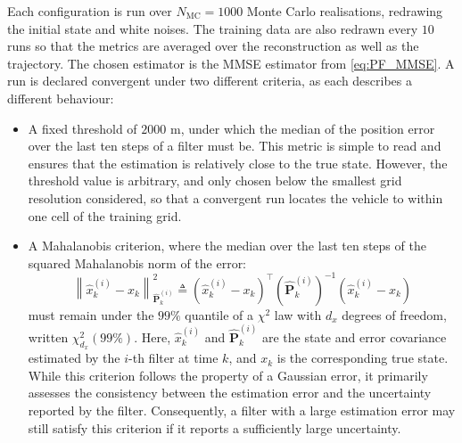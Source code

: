 Each configuration is run over $N_\mathrm{MC}=1000$ Monte Carlo realisations, redrawing the initial state and white noises. The training data are also redrawn every $10$ runs so that the metrics are averaged over the reconstruction as well as the trajectory. The chosen estimator is the MMSE estimator from \eqref{eq:PF_MMSE}. A run is declared convergent under two different criteria, as each describes a different behaviour:
\begin{itemize}
	\item A fixed threshold of $2000$ m, under which the median of the position error over the last ten steps of a filter must be. This metric is simple to read and ensures that the estimation is relatively close to the true state. However, the threshold value is arbitrary, and only chosen below the smallest grid resolution considered, so that a convergent run locates the vehicle to within one cell of the training grid.
	\item A Mahalanobis criterion, where the median over the last ten steps of the squared Mahalanobis norm of the error:
	\begin{equation}
		\left\|\hat{x}_k^{(i)}-x_k\right\|_{\hat{\mathbf{P}}_k^{(i)}}^2\triangleq\left(\hat{x}_k^{(i)}-x_k\right)^\top\left(\hat{\mathbf{P}}_k^{(i)}\right)^{-1}\left(\hat{x}_k^{(i)}-x_k\right)
	\end{equation}
	must remain under the $99\%$ quantile of a $\chi^2$ law with $d_x$ degrees of freedom, written $\chi_{d_x}^2(99\%)$. Here, $\hat{x}_k^{(i)}$ and $\hat{\mathbf{P}}_k^{(i)}$ are the state and error covariance estimated by the $i$-th filter at time $k$, and $x_k$ is the corresponding true state. While this criterion follows the property of a Gaussian error, it primarily assesses the consistency between the estimation error and the uncertainty reported by the filter. Consequently, a filter with a large estimation error may still satisfy this criterion if it reports a sufficiently large uncertainty.
\end{itemize}

